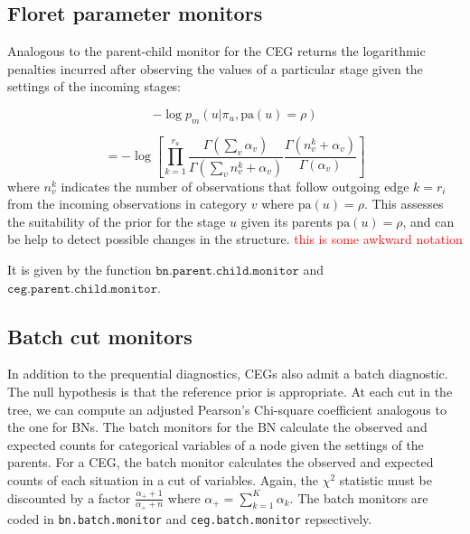 \documentclass[12pt]{article}
\begin{document}
\subsection{Floret parameter monitors} %

Analogous to the parent-child monitor for the CEG returns the logarithmic penalties incurred after observing the values of a particular stage given the settings of the incoming stages:

\[
-\log p_m( u | \pi_u, \text{pa}(u) = \rho)
\]
 
 \[
=-\log \left[ \prod_{k=1} ^ {r_u} \frac{\Gamma (\sum_v \alpha_v)}{\Gamma(\sum_v n_v^k + \alpha_v)}  \frac{\Gamma(n_v^k + \alpha_v)}{\Gamma(\alpha_v)} \right]
 \]
  where $n_v^k$ indicates the number of observations that follow outgoing edge $k=r_i$ from the incoming observations in category $v$ where $\text{pa}(u) = \rho$. This assesses the suitability of the prior for the stage $u$ given its parents  $\text{pa}(u) = \rho$, and can be help to detect possible changes in the structure. \textcolor{red}{this is some awkward notation}
  
  It is given by the function $\texttt{bn.parent.child.monitor}$ and $\texttt{ceg.parent.child.monitor}$. 

%
%

\subsection{Batch cut monitors}
In addition to the prequential diagnostics, CEGs also admit a batch diagnostic. The null hypothesis is that the reference prior is appropriate. At each cut in the tree, we can compute an adjusted Pearson's Chi-square coefficient analogous to the one for BNs.  The batch monitors for the BN calculate the observed and expected counts for categorical variables of a node given the settings of the parents. For a CEG, the batch monitor calculates the observed and expected counts of each situation in a cut of variables.
Again, the $\chi^2$ statistic must be discounted by a factor $\frac{\alpha_+ + 1}{\alpha_+ + n }$ where $\alpha_+ = \sum_{k=1}^K \alpha_k$. The batch monitors are coded in \texttt{bn.batch.monitor} and \texttt{ceg.batch.monitor} repsectively.
\end{document}
